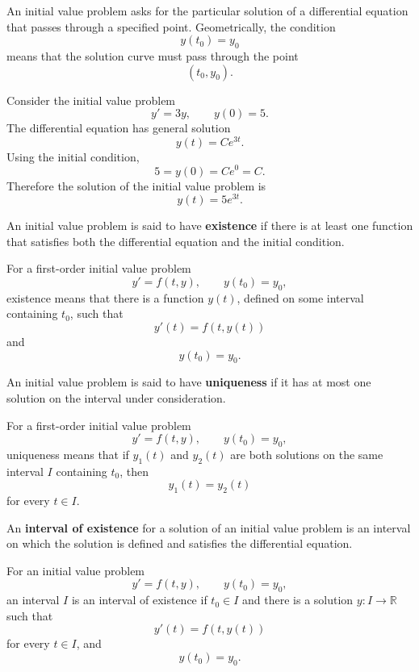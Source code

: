 \begin{remark*}[Interpretation]
An initial value problem asks for the particular solution of a differential equation that passes through a specified point. Geometrically, the condition
\[
y(t_0)=y_0
\]
means that the solution curve must pass through the point
\[
(t_0,y_0).
\]
\end{remark*}

\begin{example}
Consider the initial value problem
\[
y'=3y,
\qquad
y(0)=5.
\]
The differential equation has general solution
\[
y(t)=Ce^{3t}.
\]
Using the initial condition,
\[
5=y(0)=Ce^0=C.
\]
Therefore the solution of the initial value problem is
\[
y(t)=5e^{3t}.
\]
\end{example}



\begin{definition}[Existence]
An initial value problem is said to have \textbf{existence} if there is at least one function that satisfies both the differential equation and the initial condition.

For a first-order initial value problem
\[
y'=f(t,y),
\qquad
y(t_0)=y_0,
\]
existence means that there is a function $y(t)$, defined on some interval containing $t_0$, such that
\[
y'(t)=f(t,y(t))
\]
and
\[
y(t_0)=y_0.
\]
\end{definition}

\begin{definition}[Uniqueness]
An initial value problem is said to have \textbf{uniqueness} if it has at most one solution on the interval under consideration.

For a first-order initial value problem
\[
y'=f(t,y),
\qquad
y(t_0)=y_0,
\]
uniqueness means that if $y_1(t)$ and $y_2(t)$ are both solutions on the same interval $I$ containing $t_0$, then
\[
y_1(t)=y_2(t)
\]
for every $t\in I$.
\end{definition}

\begin{definition}
An \textbf{interval of existence} for a solution of an initial value problem is an interval on which the solution is defined and satisfies the differential equation.

For an initial value problem
\[
y'=f(t,y),
\qquad
y(t_0)=y_0,
\]
an interval $I$ is an interval of existence if $t_0\in I$ and there is a solution $y:I\to\mathbb{R}$ such that
\[
y'(t)=f(t,y(t))
\]
for every $t\in I$, and
\[
y(t_0)=y_0.
\]
\end{definition}

